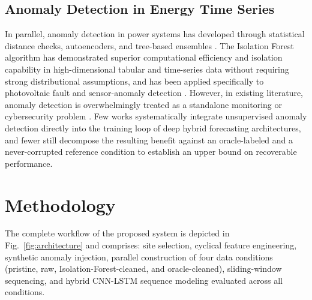 \documentclass[conference]{IEEEtran}
\begin{document}
\subsection{Anomaly Detection in Energy Time Series}
In parallel, anomaly detection in power systems has developed through statistical distance checks, autoencoders, and tree-based ensembles \cite{zhang2021survey}. The Isolation Forest algorithm \cite{liu2008isolation} has demonstrated superior computational efficiency and isolation capability in high-dimensional tabular and time-series data without requiring strong distributional assumptions, and has been applied specifically to photovoltaic fault and sensor-anomaly detection \cite{jorry2026unsupervised}. However, in existing literature, anomaly detection is overwhelmingly treated as a standalone monitoring or cybersecurity problem \cite{zhang2021survey}. Few works systematically integrate unsupervised anomaly detection directly into the training loop of deep hybrid forecasting architectures, and fewer still decompose the resulting benefit against an oracle-labeled and a never-corrupted reference condition to establish an upper bound on recoverable performance.

\section{Methodology}

The complete workflow of the proposed system is depicted in Fig.~\ref{fig:architecture} and comprises: site selection, cyclical feature engineering, synthetic anomaly injection, parallel construction of four data conditions (pristine, raw, Isolation-Forest-cleaned, and oracle-cleaned), sliding-window sequencing, and hybrid CNN-LSTM sequence modeling evaluated across all conditions.
\end{document}

